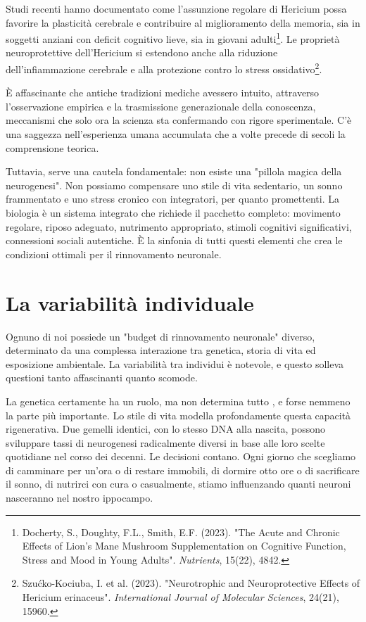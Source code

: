 Studi recenti hanno documentato come l'assunzione regolare di Hericium possa favorire la plasticità cerebrale e contribuire al miglioramento della memoria, sia in soggetti anziani con deficit cognitivo lieve, sia in giovani adulti\footnote{Docherty, S., Doughty, F.L., Smith, E.F. (2023). "The Acute and Chronic Effects of Lion's Mane Mushroom Supplementation on Cognitive Function, Stress and Mood in Young Adults". \textit{Nutrients}, 15(22), 4842.}. Le proprietà neuroprotettive dell'Hericium si estendono anche alla riduzione dell'infiammazione cerebrale e alla protezione contro lo stress ossidativo\footnote{Szućko-Kociuba, I. et al. (2023). "Neurotrophic and Neuroprotective Effects of Hericium erinaceus". \textit{International Journal of Molecular Sciences}, 24(21), 15960.}.

È affascinante che antiche tradizioni mediche avessero intuito, attraverso l'osservazione empirica e la trasmissione generazionale della conoscenza, meccanismi che solo ora la scienza sta confermando con rigore sperimentale. C'è una saggezza nell'esperienza umana accumulata che a volte precede di secoli la comprensione teorica.

Tuttavia, serve una cautela fondamentale: non esiste una "pillola magica della neurogenesi". Non possiamo compensare uno stile di vita sedentario, un sonno frammentato e uno stress cronico con integratori, per quanto promettenti. La biologia è un sistema integrato che richiede il pacchetto completo: movimento regolare, riposo adeguato, nutrimento appropriato, stimoli cognitivi significativi, connessioni sociali autentiche. È la sinfonia di tutti questi elementi che crea le condizioni ottimali per il rinnovamento neuronale.

\section{La variabilità individuale}

Ognuno di noi possiede un "budget di rinnovamento neuronale" diverso, determinato da una complessa interazione tra genetica, storia di vita ed esposizione ambientale. La variabilità tra individui è notevole, e questo solleva questioni tanto affascinanti quanto scomode.

La genetica certamente ha un ruolo, ma non determina tutto , e forse nemmeno la parte più importante. Lo stile di vita modella profondamente questa capacità rigenerativa. Due gemelli identici, con lo stesso DNA alla nascita, possono sviluppare tassi di neurogenesi radicalmente diversi in base alle loro scelte quotidiane nel corso dei decenni. Le decisioni contano. Ogni giorno che scegliamo di camminare per un'ora o di restare immobili, di dormire otto ore o di sacrificare il sonno, di nutrirci con cura o casualmente, stiamo influenzando quanti neuroni nasceranno nel nostro ippocampo.

